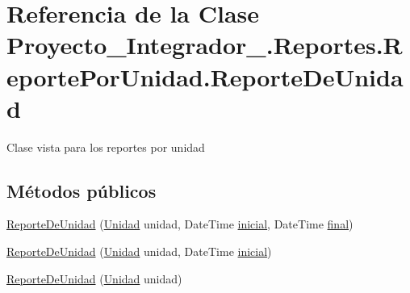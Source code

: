 \hypertarget{class_proyecto___integrador__3_1_1_reportes_1_1_reporte_por_unidad_1_1_reporte_de_unidad}{\section{Referencia de la Clase Proyecto\-\_\-\-Integrador\-\_.\-Reportes.\-Reporte\-Por\-Unidad.\-Reporte\-De\-Unidad}
\label{class_proyecto___integrador__3_1_1_reportes_1_1_reporte_por_unidad_1_1_reporte_de_unidad}
}


Clase vista para los reportes por unidad  


\subsection*{Métodos públicos}
\begin{DoxyCompactItemize}
\item 
\hyperlink{class_proyecto___integrador__3_1_1_reportes_1_1_reporte_por_unidad_1_1_reporte_de_unidad_a25b2af179a4601db1a2129d8200e7eee}{Reporte\-De\-Unidad} (\hyperlink{class_proyecto___integrador__3_1_1_tipos_dato_1_1_unidad}{Unidad} unidad, Date\-Time \hyperlink{class_proyecto___integrador__3_1_1_reportes_1_1_reporte_por_unidad_a580b30fc38c300431b3827dd370c794b}{inicial}, Date\-Time \hyperlink{class_proyecto___integrador__3_1_1_reportes_1_1_reporte_por_unidad_a1f1ef326bff361e8fad3182f10c5da2f}{final})
\item 
\hyperlink{class_proyecto___integrador__3_1_1_reportes_1_1_reporte_por_unidad_1_1_reporte_de_unidad_a91a1d773085fef47d41042be0162a587}{Reporte\-De\-Unidad} (\hyperlink{class_proyecto___integrador__3_1_1_tipos_dato_1_1_unidad}{Unidad} unidad, Date\-Time \hyperlink{class_proyecto___integrador__3_1_1_reportes_1_1_reporte_por_unidad_a580b30fc38c300431b3827dd370c794b}{inicial})
\item 
\hyperlink{class_proyecto___integrador__3_1_1_reportes_1_1_reporte_por_unidad_1_1_reporte_de_unidad_a128dcb976c1c91cfcc1311c21fc7fa7a}{Reporte\-De\-Unidad} (\hyperlink{class_proyecto___integrador__3_1_1_tipos_dato_1_1_unidad}{Unidad} unidad)
\end{DoxyCompactItemize}
